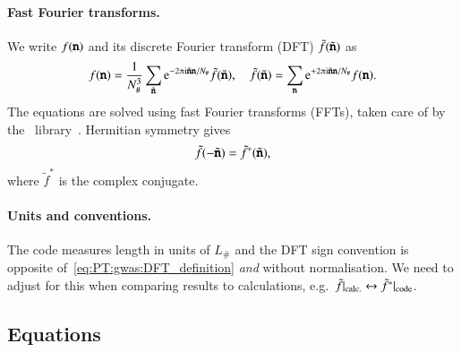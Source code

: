 

\paragraph{Fast Fourier transforms.} %
We write $f(\boldsymbol{\mathtt{n}})$ and its discrete Fourier transform (DFT) $\tilde{f}(\tilde{\boldsymbol{\mathtt{n}}})$ as
\begin{equation}\label{eq:PT:gwas:DFT_definition}
    f(\lcoordx) = \frac{1}{N_\#^3} \sum_{\lcoordk } \eu[-2\ppi \im \lcoordk \lcoordx/N_\# ]\tilde{f}(\lcoordk) , \quad \tilde{f}(\lcoordk) = \sum_{\lcoordx} \eu[+2\ppi \im \lcoordk \lcoordx/N_\#  ]f(\lcoordx).
\end{equation}
The equations are solved using fast Fourier transforms (FFTs), taken care of by the~\latfield{} library~\citep{daverioLatfield2LibraryClassical2016}. Hermitian symmetry gives
\begin{equation}
    \tilde{f}(-\tilde{\boldsymbol{\mathtt{n}}}) =  \tilde{f}^\ast(\tilde{\boldsymbol{\mathtt{n}}}),
\end{equation}
where $\tilde{f}^\ast$ is the complex conjugate. 


\paragraph{Units and conventions.} %
The code measures length in units of $L_\#$ and the DFT sign convention is opposite of~\cref{eq:PT:gwas:DFT_definition} \emph{and} without normalisation. We need to adjust for this when comparing results to calculations, e.g.~$\tilde{f}\rvert_\mathrm{calc.} \leftrightarrow \tilde{f}^\ast\rvert_\mathrm{code}$.





\subsection{Equations}


